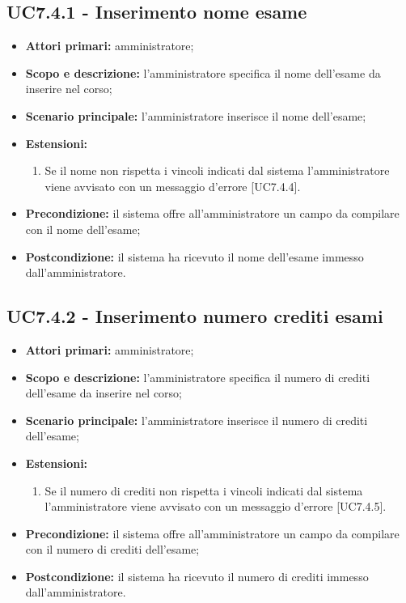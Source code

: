 \documentclass[AnalisiDeiRequisiti.tex]{subfiles}
\begin{document}
\subsection{UC7.4.1 - Inserimento nome esame}
\begin{itemize}
	\item \textbf{Attori primari:} amministratore;
	\item \textbf{Scopo e descrizione:} l'amministratore specifica il nome dell'esame da inserire nel corso;
	\item \textbf{Scenario principale:} l'amministratore inserisce il nome dell'esame;
	\item \textbf{Estensioni:}
	\begin{enumerate}
		\item Se il nome non rispetta i vincoli indicati dal sistema l'amministratore viene avvisato con un messaggio d'errore [UC7.4.4].
	\end{enumerate}
	\item \textbf{Precondizione:} il sistema offre all'amministratore un campo da compilare con il nome dell'esame; 
	\item \textbf{Postcondizione:} il sistema ha ricevuto il nome dell'esame immesso dall'amministratore.
\end{itemize}
\subsection{UC7.4.2 - Inserimento numero crediti esami}
\begin{itemize}
	\item \textbf{Attori primari:} amministratore;
	\item \textbf{Scopo e descrizione:} l'amministratore specifica il numero di crediti dell'esame da inserire nel corso;
	\item \textbf{Scenario principale:} l'amministratore inserisce il numero di crediti dell'esame;
	\item \textbf{Estensioni:}
	\begin{enumerate}
		\item Se il numero di crediti non rispetta i vincoli indicati dal sistema l'amministratore viene avvisato con un messaggio d'errore [UC7.4.5].
	\end{enumerate}
	\item \textbf{Precondizione:} il sistema offre all'amministratore un campo da compilare con il numero di crediti dell'esame; 
	\item \textbf{Postcondizione:} il sistema ha ricevuto il numero di crediti immesso dall'amministratore.
\end{itemize}
\end{document}

